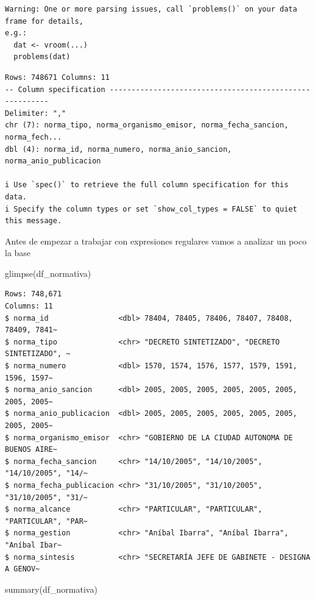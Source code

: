\documentclass[
  letterpaper,
  DIV=11,
  numbers=noendperiod]{scrreprt}
\newenvironment{Shaded}{\begin{snugshade}}{\end{snugshade}}
\newcommand{\FunctionTok}[1]{\textcolor[rgb]{0.28,0.35,0.67}{#1}}
\newcommand{\NormalTok}[1]{\textcolor[rgb]{0.00,0.23,0.31}{#1}}
\begin{document}
\begin{verbatim}
Warning: One or more parsing issues, call `problems()` on your data frame for details,
e.g.:
  dat <- vroom(...)
  problems(dat)
\end{verbatim}

\begin{verbatim}
Rows: 748671 Columns: 11
-- Column specification --------------------------------------------------------
Delimiter: ","
chr (7): norma_tipo, norma_organismo_emisor, norma_fecha_sancion, norma_fech...
dbl (4): norma_id, norma_numero, norma_anio_sancion, norma_anio_publicacion

i Use `spec()` to retrieve the full column specification for this data.
i Specify the column types or set `show_col_types = FALSE` to quiet this message.
\end{verbatim}

Antes de empezar a trabajar con expresiones regulares vamos a analizar
un poco la base

\begin{Shaded}
\begin{Highlighting}[]
\FunctionTok{glimpse}\NormalTok{(df\_normativa)}
\end{Highlighting}
\end{Shaded}

\begin{verbatim}
Rows: 748,671
Columns: 11
$ norma_id                <dbl> 78404, 78405, 78406, 78407, 78408, 78409, 7841~
$ norma_tipo              <chr> "DECRETO SINTETIZADO", "DECRETO SINTETIZADO", ~
$ norma_numero            <dbl> 1570, 1574, 1576, 1577, 1579, 1591, 1596, 1597~
$ norma_anio_sancion      <dbl> 2005, 2005, 2005, 2005, 2005, 2005, 2005, 2005~
$ norma_anio_publicacion  <dbl> 2005, 2005, 2005, 2005, 2005, 2005, 2005, 2005~
$ norma_organismo_emisor  <chr> "GOBIERNO DE LA CIUDAD AUTONOMA DE BUENOS AIRE~
$ norma_fecha_sancion     <chr> "14/10/2005", "14/10/2005", "14/10/2005", "14/~
$ norma_fecha_publicacion <chr> "31/10/2005", "31/10/2005", "31/10/2005", "31/~
$ norma_alcance           <chr> "PARTICULAR", "PARTICULAR", "PARTICULAR", "PAR~
$ norma_gestion           <chr> "Aníbal Ibarra", "Aníbal Ibarra", "Aníbal Ibar~
$ norma_sintesis          <chr> "SECRETARÍA JEFE DE GABINETE - DESIGNA A GENOV~
\end{verbatim}

\begin{Shaded}
\begin{Highlighting}[]
\FunctionTok{summary}\NormalTok{(df\_normativa)}
\end{Highlighting}
\end{Shaded}
\end{document}

